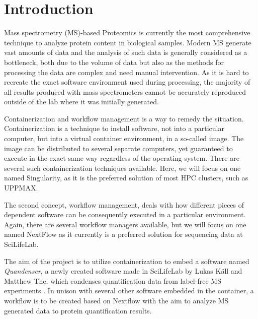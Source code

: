 \section{Introduction}

Mass spectrometry (MS)-based Proteomics is currently the most comprehensive technique to analyze protein content in biological samples. Modern MS generate vast amounts of data and the analysis of such data is generally considered as a bottleneck, both due to the volume of data but also as the methods for processing the data are complex and need manual intervention. As it is hard to recreate the exact software environment used during processing, the majority of all results produced with mass spectrometers cannot be accurately reproduced outside of the lab where it was initially generated.

Containerization and workflow management is a way to remedy the situation. Containerization is a technique to install software, not into a particular computer, but into a virtual container environment, in a so-called image. The image can be distributed to several separate computers, yet guaranteed to execute in the exact same way regardless of the operating system. There are several such containerization techniques available. Here, we will focus on one named Singularity, as it is the preferred solution of most HPC clusters, such as UPPMAX.

The second concept, workflow management, deals with how different pieces of dependent software can be consequently executed in a particular environment. Again, there are several workflow managers available, but we will focus on one named NextFlow as it currently is a preferred solution for sequencing data at SciLifeLab.

The aim of the project is to utilize containerization to embed a software named \textit{Quandenser}, a newly created software made in SciLifeLab by Lukas Käll and Matthew The, which condenses quantification data from label-free MS experiments \cite{quandenser}. In unison with several other software embedded in the container, a workflow is to be created based on Nextflow with the aim to analyze MS generated data to protein quantification results.
